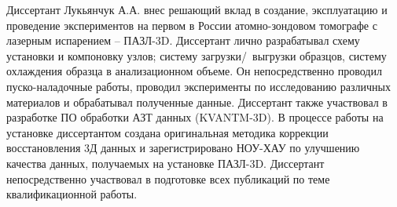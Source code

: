 {\contribution} Диссертант Лукьянчук А.А. внес решающий вклад в создание, эксплуатацию и проведение экспериментов на первом в России атомно-зондовом томографе с лазерным испарением – ПАЗЛ-3D. Диссертант лично разрабатывал схему установки и компоновку узлов; систему загрузки/~выгрузки образцов, систему охлаждения образца в анализационном объеме. Он непосредственно проводил пуско-наладочные работы, проводил эксперименты по исследованию различных материалов и обрабатывал полученные данные. Диссертант также участвовал в разработке ПО обработки АЗТ данных (KVANTM-3D). В процессе работы на установке диссертантом создана оригинальная методика коррекции восстановления 3Д данных и зарегистрировано НОУ-ХАУ по улучшению качества данных, получаемых на установке ПАЗЛ-3D. Диссертант непосредственно участвовал в подготовке всех публикаций по теме квалификационной работы.






